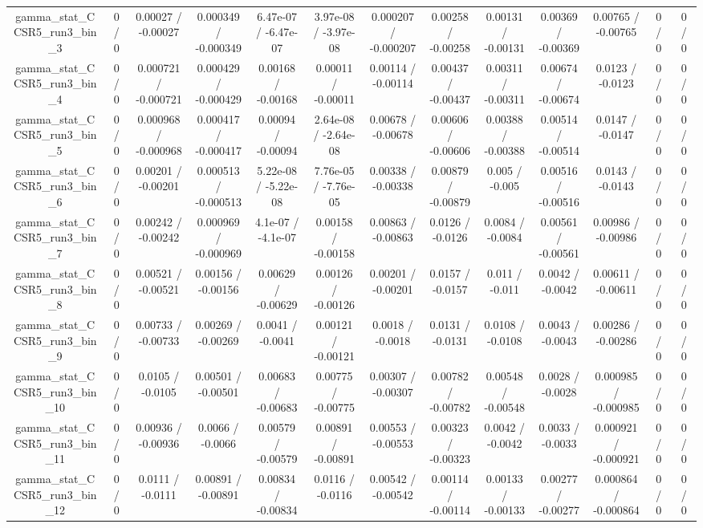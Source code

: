 \documentclass[10pt]{article}
\begin{document}
\begin{table}[htbp]
\begin{center}
\begin{tabular}{|c|c|c|c|c|c|c|c|c|c|c|c|c|}
  gamma_stat_CCSR5_run3_bin_3 & 0 / 0 & 0.00027 / -0.00027 & 0.000349 / -0.000349 & 6.47e-07 / -6.47e-07 & 3.97e-08 / -3.97e-08 & 0.000207 / -0.000207 & 0.00258 / -0.00258 & 0.00131 / -0.00131 & 0.00369 / -0.00369 & 0.00765 / -0.00765 & 0 / 0 & 0 / 0 \\ 
  gamma_stat_CCSR5_run3_bin_4 & 0 / 0 & 0.000721 / -0.000721 & 0.000429 / -0.000429 & 0.00168 / -0.00168 & 0.00011 / -0.00011 & 0.00114 / -0.00114 & 0.00437 / -0.00437 & 0.00311 / -0.00311 & 0.00674 / -0.00674 & 0.0123 / -0.0123 & 0 / 0 & 0 / 0 \\ 
  gamma_stat_CCSR5_run3_bin_5 & 0 / 0 & 0.000968 / -0.000968 & 0.000417 / -0.000417 & 0.00094 / -0.00094 & 2.64e-08 / -2.64e-08 & 0.00678 / -0.00678 & 0.00606 / -0.00606 & 0.00388 / -0.00388 & 0.00514 / -0.00514 & 0.0147 / -0.0147 & 0 / 0 & 0 / 0 \\ 
  gamma_stat_CCSR5_run3_bin_6 & 0 / 0 & 0.00201 / -0.00201 & 0.000513 / -0.000513 & 5.22e-08 / -5.22e-08 & 7.76e-05 / -7.76e-05 & 0.00338 / -0.00338 & 0.00879 / -0.00879 & 0.005 / -0.005 & 0.00516 / -0.00516 & 0.0143 / -0.0143 & 0 / 0 & 0 / 0 \\ 
  gamma_stat_CCSR5_run3_bin_7 & 0 / 0 & 0.00242 / -0.00242 & 0.000969 / -0.000969 & 4.1e-07 / -4.1e-07 & 0.00158 / -0.00158 & 0.00863 / -0.00863 & 0.0126 / -0.0126 & 0.0084 / -0.0084 & 0.00561 / -0.00561 & 0.00986 / -0.00986 & 0 / 0 & 0 / 0 \\ 
  gamma_stat_CCSR5_run3_bin_8 & 0 / 0 & 0.00521 / -0.00521 & 0.00156 / -0.00156 & 0.00629 / -0.00629 & 0.00126 / -0.00126 & 0.00201 / -0.00201 & 0.0157 / -0.0157 & 0.011 / -0.011 & 0.0042 / -0.0042 & 0.00611 / -0.00611 & 0 / 0 & 0 / 0 \\ 
  gamma_stat_CCSR5_run3_bin_9 & 0 / 0 & 0.00733 / -0.00733 & 0.00269 / -0.00269 & 0.0041 / -0.0041 & 0.00121 / -0.00121 & 0.0018 / -0.0018 & 0.0131 / -0.0131 & 0.0108 / -0.0108 & 0.0043 / -0.0043 & 0.00286 / -0.00286 & 0 / 0 & 0 / 0 \\ 
  gamma_stat_CCSR5_run3_bin_10 & 0 / 0 & 0.0105 / -0.0105 & 0.00501 / -0.00501 & 0.00683 / -0.00683 & 0.00775 / -0.00775 & 0.00307 / -0.00307 & 0.00782 / -0.00782 & 0.00548 / -0.00548 & 0.0028 / -0.0028 & 0.000985 / -0.000985 & 0 / 0 & 0 / 0 \\ 
  gamma_stat_CCSR5_run3_bin_11 & 0 / 0 & 0.00936 / -0.00936 & 0.0066 / -0.0066 & 0.00579 / -0.00579 & 0.00891 / -0.00891 & 0.00553 / -0.00553 & 0.00323 / -0.00323 & 0.0042 / -0.0042 & 0.0033 / -0.0033 & 0.000921 / -0.000921 & 0 / 0 & 0 / 0 \\ 
  gamma_stat_CCSR5_run3_bin_12 & 0 / 0 & 0.0111 / -0.0111 & 0.00891 / -0.00891 & 0.00834 / -0.00834 & 0.0116 / -0.0116 & 0.00542 / -0.00542 & 0.00114 / -0.00114 & 0.00133 / -0.00133 & 0.00277 / -0.00277 & 0.000864 / -0.000864 & 0 / 0 & 0 / 0 \\ 

\end{tabular}
\end{center}
\end{table}
\end{document}

